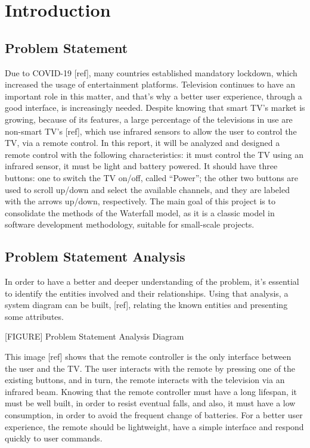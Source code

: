 \documentclass[12pt, letterpaper]{report}
\begin{document}
\chapter{Introduction}
\section{Problem Statement}
Due to COVID-19 [ref], many countries established mandatory lockdown, which increased the usage of entertainment platforms. Television continues to have an important role in this matter, and that’s why a better user experience, through a good interface, is increasingly needed.
Despite knowing that smart TV’s market is growing, because of its features, a large percentage of the televisions in use are non-smart TV’s [ref], which use infrared sensors to allow the user to control the TV, via a remote control. In this report, it will be analyzed and designed a remote control with the following characteristics: it must control the TV using an infrared sensor, it must be light and battery powered. It should have three buttons: one to switch the TV on/off, called “Power”; the other two buttons are used to scroll up/down and select the available channels, and they are labeled with the arrows up/down, respectively. The main goal of this project is to consolidate the methods of the Waterfall model, as it is a classic model in software development methodology, suitable for small-scale projects.

\section{Problem Statement Analysis}
In order to have a better and deeper understanding of the problem, it’s essential to identify the entities involved and their relationships. Using that analysis, a system diagram can be built, [ref], relating the known entities and presenting some attributes.

[FIGURE] Problem Statement Analysis Diagram

This image [ref] shows that the remote controller is the only interface between the user and the TV. The user interacts with the remote by pressing one of the existing buttons, and in turn, the remote interacts with the television via an infrared beam. Knowing that the remote controller must have a long lifespan, it must be well built, in order to resist eventual falls, and also, it must have a low consumption, in order to avoid the frequent change of batteries. For a better user experience, the remote should be lightweight, have a simple interface and respond quickly to user commands.
\end{document}
